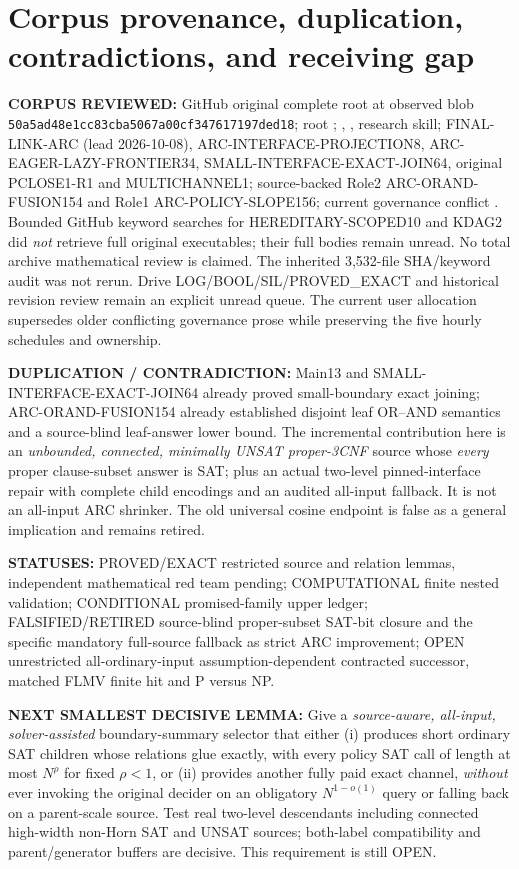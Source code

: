 \documentclass[11pt]{article}
\begin{document}
\section{Corpus provenance, duplication, contradictions, and receiving gap}
\textbf{CORPUS REVIEWED:} GitHub original complete root  at observed blob \texttt{50a5ad48e1cc83cba5067a00cf347617197ded18}; root ; , , research skill; FINAL-LINK-ARC (lead 2026-10-08), ARC-INTERFACE-PROJECTION8, ARC-EAGER-LAZY-FRONTIER34, SMALL-INTERFACE-EXACT-JOIN64, original PCLOSE1-R1 and MULTICHANNEL1; source-backed Role2 ARC-ORAND-FUSION154 and Role1 ARC-POLICY-SLOPE156; current governance conflict . Bounded GitHub keyword searches for HEREDITARY-SCOPED10 and KDAG2 did \emph{not} retrieve full original executables; their full bodies remain unread. No total archive mathematical review is claimed. The inherited 3,532-file SHA/keyword audit was not rerun. Drive LOG/BOOL/SIL/PROVED\_EXACT and historical revision review remain an explicit unread queue. The current user allocation supersedes older conflicting governance prose while preserving the five hourly schedules and ownership.

\textbf{DUPLICATION / CONTRADICTION:} Main13 and SMALL-INTERFACE-EXACT-JOIN64 already proved small-boundary exact joining; ARC-ORAND-FUSION154 already established disjoint leaf OR--AND semantics and a source-blind leaf-answer lower bound. The incremental contribution here is an \emph{unbounded, connected, minimally UNSAT proper-3CNF} source whose \emph{every} proper clause-subset answer is SAT; plus an actual two-level pinned-interface repair with complete child encodings and an audited all-input fallback. It is not an all-input ARC shrinker. The old universal cosine endpoint is false as a general implication and remains retired.

\textbf{STATUSES:} PROVED/EXACT restricted source and relation lemmas, independent mathematical red team pending; COMPUTATIONAL finite nested validation; CONDITIONAL promised-family upper ledger; FALSIFIED/RETIRED source-blind proper-subset SAT-bit closure and the specific mandatory full-source fallback as strict ARC improvement; OPEN unrestricted all-ordinary-input assumption-dependent contracted successor, matched FLMV finite hit and P versus NP.

\textbf{NEXT SMALLEST DECISIVE LEMMA:} Give a \emph{source-aware, all-input, solver-assisted} boundary-summary selector that either (i) produces short ordinary SAT children whose relations glue exactly, with every policy SAT call of length at most $N^\rho$ for fixed $\rho<1$, or (ii) provides another fully paid exact channel, \emph{without} ever invoking the original decider on an obligatory $N^{1-o(1)}$ query or falling back on a parent-scale source. Test real two-level descendants including connected high-width non-Horn SAT and UNSAT sources; both-label compatibility and parent/generator buffers are decisive. This requirement is still OPEN.
\end{document}
